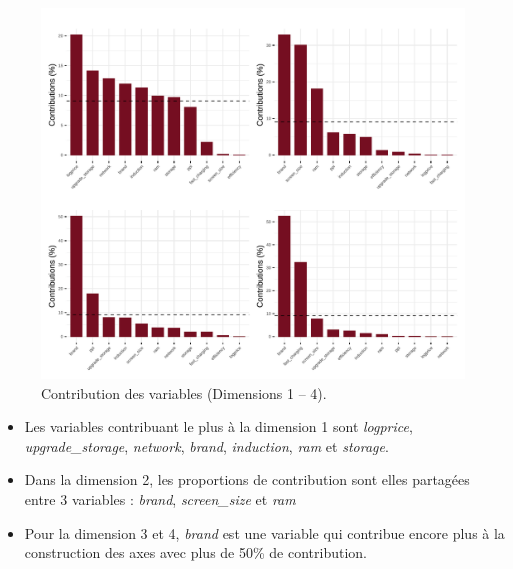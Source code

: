\documentclass[
  12pt,
]{report}
\begin{document}
\begin{figure}[H]

{\centering \includegraphics{report_files/figure-pdf/unnamed-chunk-11-1.pdf}

}

\caption{Contribution des variables (Dimensions 1 -- 4).}

\end{figure}%

\begin{itemize}
\item
  Les variables contribuant le plus à la dimension 1 sont
  \emph{logprice}, \emph{upgrade\_storage}, \emph{network},
  \emph{brand}, \emph{induction}, \emph{ram} et \emph{storage}.
\item
  Dans la dimension 2, les proportions de contribution sont elles
  partagées entre 3 variables : \emph{brand}, \emph{screen\_size} et
  \emph{ram}
\item
  Pour la dimension 3 et 4, \emph{brand} est une variable qui contribue
  encore plus à la construction des axes avec plus de 50\% de
  contribution.
\end{itemize}
\end{document}
